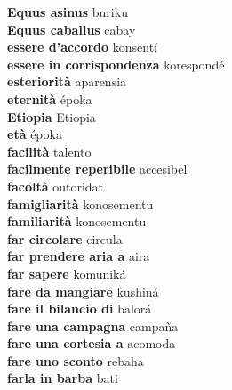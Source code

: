 \textbf{ Equus asinus  } buriku \\
\textbf{ Equus caballus  } cabay \\
\textbf{ essere d’accordo  } konsentí \\
\textbf{ essere in corrispondenza  } korespondé \\
\textbf{ esteriorità  } aparensia \\
\textbf{ eternità  } époka \\
\textbf{ Etiopia  } Etiopia \\
\textbf{ età  } époka \\
\textbf{ facilità  } talento \\
\textbf{ facilmente reperibile  } accesibel \\
\textbf{ facoltà  } outoridat \\
\textbf{ famigliarità  } konosementu \\
\textbf{ familiarità  } konosementu \\
\textbf{ far circolare  } circula \\
\textbf{ far prendere aria a  } aira \\
\textbf{ far sapere  } komuniká \\
\textbf{ fare da mangiare  } kushiná \\
\textbf{ fare il bilancio di  } balorá \\
\textbf{ fare una campagna  } campaña \\
\textbf{ fare una cortesia a  } acomoda \\
\textbf{ fare uno sconto  } rebaha \\
\textbf{ farla in barba  } bati \\
